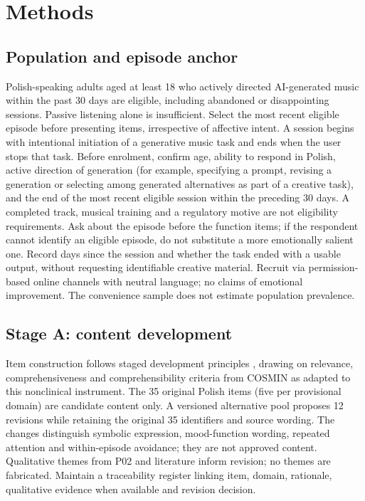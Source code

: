 \section{Methods}
\subsection{Population and episode anchor}
Polish-speaking adults aged at least 18 who actively directed AI-generated music within the past 30 days are eligible, including abandoned or disappointing sessions. Passive listening alone is insufficient. Select the most recent eligible episode before presenting items, irrespective of affective intent. A session begins with intentional initiation of a generative music task and ends when the user stops that task. Before enrolment, confirm age, ability to respond in Polish, active direction of generation (for example, specifying a prompt, revising a generation or selecting among generated alternatives as part of a creative task), and the end of the most recent eligible session within the preceding 30 days. A completed track, musical training and a regulatory motive are not eligibility requirements. Ask about the episode before the function items; if the respondent cannot identify an eligible episode, do not substitute a more emotionally salient one. Record days since the session and whether the task ended with a usable output, without requesting identifiable creative material. Recruit via permission-based online channels with neutral language; no claims of emotional improvement. The convenience sample does not estimate population prevalence.

\subsection{Stage A: content development}
Item construction follows staged development principles \parencite{boateng2018}, drawing on relevance, comprehensiveness and comprehensibility criteria from COSMIN \parencite{terwee2018} as adapted to this nonclinical instrument. The 35 original Polish items (five per provisional domain) are candidate content only. A versioned alternative pool proposes 12 revisions while retaining the original 35 identifiers and source wording. The changes distinguish symbolic expression, mood-function wording, repeated attention and within-episode avoidance; they are not approved content. Qualitative themes from P02 and literature inform revision; no themes are fabricated. Maintain a traceability register linking item, domain, rationale, qualitative evidence when available and revision decision.

